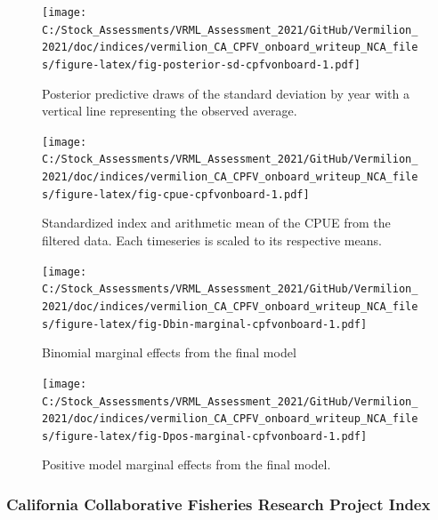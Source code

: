 \documentclass[11pt,
  english,
  a4paper,
]{article}
\begin{document}
\begin{figure}
\centering
\texttt{[image: C:/Stock\_Assessments/VRML\_Assessment\_2021/GitHub/Vermilion\_2021/doc/indices/vermilion\_CA\_CPFV\_onboard\_writeup\_NCA\_files/figure-latex/fig-posterior-sd-cpfvonboard-1.pdf]}
\caption{\label{fig:fig-posterior-sd-cpfvonboard}Posterior predictive draws of the standard deviation by year with a vertical line representing the observed average.}
\end{figure}

\begin{figure}
\centering
\texttt{[image: C:/Stock\_Assessments/VRML\_Assessment\_2021/GitHub/Vermilion\_2021/doc/indices/vermilion\_CA\_CPFV\_onboard\_writeup\_NCA\_files/figure-latex/fig-cpue-cpfvonboard-1.pdf]}
\caption{\label{fig:fig-cpue-cpfvonboard}Standardized index and arithmetic mean of the CPUE from the filtered data. Each timeseries is scaled to its respective means.}
\end{figure}

\begin{figure}
\centering
\texttt{[image: C:/Stock\_Assessments/VRML\_Assessment\_2021/GitHub/Vermilion\_2021/doc/indices/vermilion\_CA\_CPFV\_onboard\_writeup\_NCA\_files/figure-latex/fig-Dbin-marginal-cpfvonboard-1.pdf]}
\caption{\label{fig:fig-Dbin-marginal-cpfvonboard}Binomial marginal effects from the final model}
\end{figure}

\begin{figure}
\centering
\texttt{[image: C:/Stock\_Assessments/VRML\_Assessment\_2021/GitHub/Vermilion\_2021/doc/indices/vermilion\_CA\_CPFV\_onboard\_writeup\_NCA\_files/figure-latex/fig-Dpos-marginal-cpfvonboard-1.pdf]}
\caption{\label{fig:fig-Dpos-marginal-cpfvonboard}Positive model marginal effects from the final model.}
\end{figure}


\hypertarget{california-collaborative-fisheries-research-project-index}{%
\subsubsection{California Collaborative Fisheries Research Project Index}\label{california-collaborative-fisheries-research-project-index}}

\leavevmode\tagmcend\tagstructend
\end{document}
